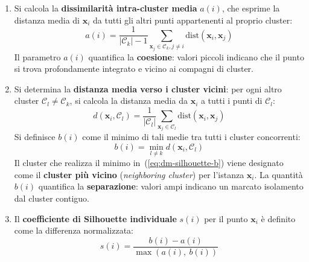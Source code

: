 \begin{enumerate}
    \item Si calcola la \textbf{dissimilarità intra-cluster media} $a(i)$, che esprime la distanza media di $\mathbf{x}_i$ da tutti gli altri punti appartenenti al proprio cluster:
    \begin{equation}
    \label{eq:dm-silhouette-a}
    a(i) = \frac{1}{|\mathcal{C}_k| - 1} \sum_{\mathbf{x}_j \in \mathcal{C}_k, j \ne i} \mathrm{dist}(\mathbf{x}_i, \mathbf{x}_j)
    \end{equation}
    Il parametro $a(i)$ quantifica la \textbf{coesione}: valori piccoli indicano che il punto si trova profondamente integrato e vicino ai compagni di cluster.
    
    \item Si determina la \textbf{distanza media verso i cluster vicini}: per ogni altro cluster $\mathcal{C}_l \ne \mathcal{C}_k$, si calcola la distanza media da $\mathbf{x}_i$ a tutti i punti di $\mathcal{C}_l$:
    \begin{equation}
    d(\mathbf{x}_i, \mathcal{C}_l) = \frac{1}{|\mathcal{C}_l|} \sum_{\mathbf{x}_j \in \mathcal{C}_l} \mathrm{dist}(\mathbf{x}_i, \mathbf{x}_j)
    \end{equation}
    Si definisce $b(i)$ come il minimo di tali medie tra tutti i cluster concorrenti:
    \begin{equation}
    \label{eq:dm-silhouette-b}
    b(i) = \min_{l \ne k} d(\mathbf{x}_i, \mathcal{C}_l)
    \end{equation}
    Il cluster che realizza il minimo in~(\ref{eq:dm-silhouette-b}) viene designato come il \textbf{cluster più vicino} (\textit{neighboring cluster}) per l'istanza $\mathbf{x}_i$. La quantità $b(i)$ quantifica la \textbf{separazione}: valori ampi indicano un marcato isolamento dal cluster contiguo.
    
    \item Il \textbf{coefficiente di Silhouette individuale} $s(i)$ per il punto $\mathbf{x}_i$ è definito come la differenza normalizzata:
    \begin{equation}
    \label{eq:dm-silhouette-s}
    s(i) = \frac{b(i) - a(i)}{\max\left(a(i), \ b(i)\right)}
    \end{equation}
\end{enumerate}

